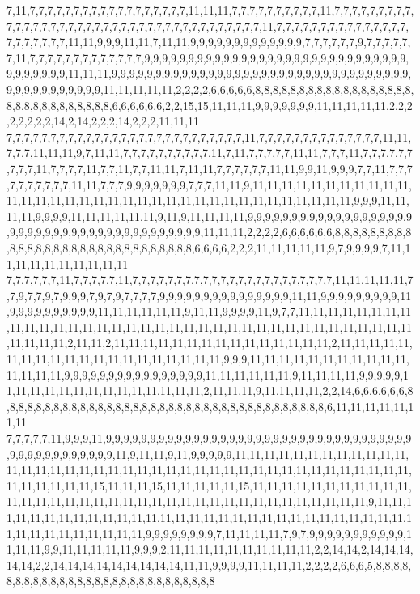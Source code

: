 7,11,7,7,7,7,7,7,7,7,7,7,7,7,7,7,7,7,7,7,11,11,11,7,7,7,7,7,7,7,7,7,7,11,7,7,7,7,7,7,7,7,7,7,7,7,7,7,7,7,7,7,7,7,7,7,7,7,7,7,7,7,7,7,7,7,7,7,7,7,7,7,11,7,7,7,7,7,7,7,7,7,7,7,7,7,7,7,7,7,7,7,7,7,7,11,11,9,9,9,11,11,7,11,11,9,9,9,9,9,9,9,9,9,9,9,9,9,7,7,7,7,7,7,9,7,7,7,7,7,7,11,7,7,7,7,7,7,7,7,7,7,7,7,7,9,9,9,9,9,9,9,9,9,9,9,9,9,9,9,9,9,9,9,9,9,9,9,9,9,9,9,9,9,9,9,9,9,9,9,9,9,11,11,11,9,9,9,9,9,9,9,9,9,9,9,9,9,9,9,9,9,9,9,9,9,9,9,9,9,9,9,9,9,9,9,9,9,9,9,9,9,9,9,9,9,9,9,9,9,11,11,11,11,11,2,2,2,2,6,6,6,6,6,8,8,8,8,8,8,8,8,8,8,8,8,8,8,8,8,8,8,8,8,8,8,8,8,8,8,8,8,8,8,6,6,6,6,6,6,2,2,15,15,11,11,11,9,9,9,9,9,9,9,11,11,11,11,11,2,2,2,2,2,2,2,2,14,2,14,2,2,2,14,2,2,2,11,11,11
7,7,7,7,7,7,7,7,7,7,7,7,7,7,7,7,7,7,7,7,7,7,7,7,7,7,7,11,7,7,7,7,7,7,7,7,7,7,7,7,7,7,11,11,7,7,7,11,11,11,9,7,11,11,7,7,7,7,7,7,7,7,7,7,11,7,11,7,7,7,7,7,11,11,7,7,7,11,7,7,7,7,7,7,7,7,7,11,7,7,7,7,11,7,7,11,7,7,11,11,7,11,11,7,7,7,7,7,7,11,11,9,9,11,9,9,9,7,7,11,7,7,7,7,7,7,7,7,7,7,11,11,7,7,7,9,9,9,9,9,9,9,7,7,7,11,11,9,11,11,11,11,11,11,11,11,11,11,11,11,11,11,11,11,11,11,11,11,11,11,11,11,11,11,11,11,11,11,11,11,11,11,11,9,9,9,11,11,11,11,9,9,9,9,11,11,11,11,11,11,9,11,9,11,11,11,11,9,9,9,9,9,9,9,9,9,9,9,9,9,9,9,9,9,9,9,9,9,9,9,9,9,9,9,9,9,9,9,9,9,9,9,9,9,9,9,9,9,11,11,11,2,2,2,2,6,6,6,6,6,6,8,8,8,8,8,8,8,8,8,8,8,8,8,8,8,8,8,8,8,8,8,8,8,8,8,8,8,8,8,8,6,6,6,6,2,2,2,11,11,11,11,11,9,7,9,9,9,9,7,11,11,11,11,11,11,11,11,11,11
7,7,7,7,7,7,11,7,7,7,7,7,11,7,7,7,7,7,7,7,7,7,7,7,7,7,7,7,7,7,7,7,7,7,7,7,11,11,11,11,11,7,7,9,7,7,9,7,9,9,9,7,9,7,9,7,7,7,7,9,9,9,9,9,9,9,9,9,9,9,9,9,9,9,11,11,9,9,9,9,9,9,9,9,9,11,9,9,9,9,9,9,9,9,9,9,11,11,11,11,11,11,9,11,11,9,9,9,9,11,9,7,7,11,11,11,11,11,11,11,11,11,11,11,11,11,11,11,11,11,11,11,11,11,11,11,11,11,11,11,11,11,11,11,11,11,11,11,11,11,11,11,11,2,11,11,2,11,11,11,11,11,11,11,11,11,11,11,11,11,11,11,2,11,11,11,11,11,11,11,11,11,11,11,11,11,11,11,11,11,11,11,11,9,9,9,11,11,11,11,11,11,11,11,11,11,11,11,11,11,11,9,9,9,9,9,9,9,9,9,9,9,9,9,9,9,9,11,11,11,11,11,11,9,11,11,11,11,9,9,9,9,9,11,11,11,11,11,11,11,11,11,11,11,11,11,11,2,11,11,11,9,11,11,11,11,2,2,14,6,6,6,6,6,6,8,8,8,8,8,8,8,8,8,8,8,8,8,8,8,8,8,8,8,8,8,8,8,8,8,8,8,8,8,8,8,8,8,8,8,8,8,6,11,11,11,11,11,11,11
7,7,7,7,7,11,9,9,9,11,9,9,9,9,9,9,9,9,9,9,9,9,9,9,9,9,9,9,9,9,9,9,9,9,9,9,9,9,9,9,9,9,9,9,9,9,9,9,9,9,9,9,9,9,9,9,9,11,9,11,11,9,11,9,9,9,9,9,11,11,11,11,11,11,11,11,11,11,11,11,11,11,11,11,11,11,11,11,11,11,11,11,11,11,11,11,11,11,11,11,11,11,11,11,11,11,11,11,11,11,11,11,11,11,15,11,11,11,15,11,11,11,11,11,15,11,11,11,11,11,11,11,11,11,11,11,11,11,11,11,11,11,11,11,11,11,11,11,11,11,11,11,11,11,11,11,11,11,11,11,11,9,11,11,11,11,11,11,11,11,11,11,11,11,11,11,11,11,11,11,11,11,11,11,11,11,11,11,11,11,11,11,11,11,11,11,11,11,11,11,11,11,9,9,9,9,9,9,9,9,7,11,11,11,11,7,9,7,9,9,9,9,9,9,9,9,9,9,9,11,11,11,9,9,11,11,11,11,11,9,9,9,2,11,11,11,11,11,11,11,11,11,11,2,2,14,14,2,14,14,14,14,14,2,2,14,14,14,14,14,14,14,14,14,11,11,9,9,9,9,11,11,11,11,2,2,2,2,6,6,6,5,8,8,8,8,8,8,8,8,8,8,8,8,8,8,8,8,8,8,8,8,8,8,8,8,8,8,8,8
